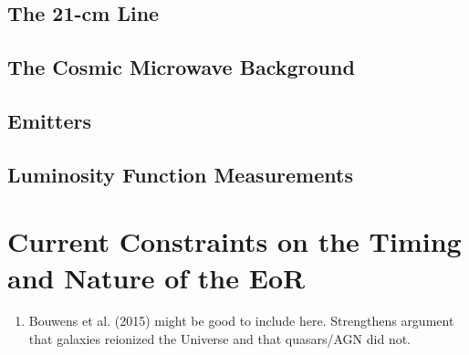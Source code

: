 \subsection{The 21-cm Line}
\subsection{The Cosmic Microwave Background}
\subsection{\lya Emitters}
\subsection{Luminosity Function Measurements}

\section{Current Constraints on the Timing and Nature of the EoR}

\begin{enumerate}
\item Bouwens et al. (2015) might be good to include here. Strengthens argument that galaxies reionized the Universe and that quasars/AGN did not.
\end{enumerate}




